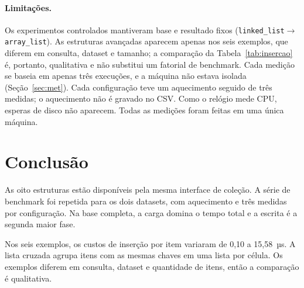 \documentclass[11pt,a4paper]{article}
\begin{document}
\paragraph{Limitações.} Os experimentos controlados mantiveram base e resultado fixos (\texttt{linked\_\allowbreak{}list}$\rightarrow$\allowbreak{}\texttt{array\_\allowbreak{}list}). As estruturas avançadas aparecem apenas nos seis exemplos, que diferem em consulta, dataset e tamanho; a comparação da Tabela~\ref{tab:insercao} é, portanto, qualitativa e não substitui um fatorial de benchmark. Cada medição se baseia em apenas três execuções, e a máquina não estava isolada (Seção~\ref{sec:met}). Cada configuração teve um aquecimento seguido de três medidas; o aquecimento não é gravado no CSV. Como o relógio mede CPU, esperas de disco não aparecem. Todas as medições foram feitas em uma única máquina.

\section{Conclusão}

As oito estruturas estão disponíveis pela mesma interface de coleção. A série de benchmark foi repetida para os dois datasets, com aquecimento e três medidas por configuração. Na base completa, a carga domina o tempo total e a escrita é a segunda maior fase.

Nos seis exemplos, os custos de inserção por item variaram de 0,10 a 15,58~µs. A lista cruzada agrupa itens com as mesmas chaves em uma lista por célula. Os exemplos diferem em consulta, dataset e quantidade de itens, então a comparação é qualitativa.
\end{document}
